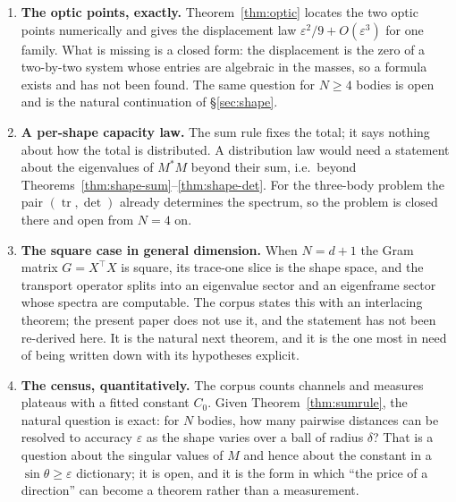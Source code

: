 \begin{enumerate}[label=\textbf{O\arabic*.},leftmargin=2.4em]
\item \textbf{The optic points, exactly.} Theorem~\ref{thm:optic} locates the two optic points
numerically and gives the displacement law $\varepsilon^2/9+O(\varepsilon^3)$ for one family.
What is missing is a closed form: the displacement is the zero of a two-by-two system whose
entries are algebraic in the masses, so a formula exists and has not been found. The same
question for $N\ge4$ bodies is open and is the natural continuation of \S\ref{sec:shape}.

\item \textbf{A per-shape capacity law.} The sum rule fixes the total; it says nothing about how
the total is distributed. A distribution law would need a statement about the eigenvalues of
$M^*M$ beyond their sum, i.e.\ beyond Theorems~\ref{thm:shape-sum}--\ref{thm:shape-det}. For the
three-body problem the pair $(\operatorname{tr},\det)$ already determines the spectrum, so the
problem is closed there and open from $N=4$ on.

\item \textbf{The square case in general dimension.} When $N=d+1$ the Gram matrix $G=X^\top X$ is
square, its trace-one slice is the shape space, and the transport operator splits into an
eigenvalue sector and an eigenframe sector whose spectra are computable. The corpus states this
with an interlacing theorem; the present paper does not use it, and the statement has not been
re-derived here. It is the natural next theorem, and it is the one most in need of being written
down with its hypotheses explicit.

\item \textbf{The census, quantitatively.} The corpus counts channels and measures plateaus with
a fitted constant $C_0$. Given Theorem~\ref{thm:sumrule}, the natural question is exact: for
$N$ bodies, how many pairwise distances can be resolved to accuracy $\varepsilon$ as the shape
varies over a ball of radius $\delta$? That is a question about the singular values of $M$ and
hence about the constant in a $\sin\theta\ge\varepsilon$ dictionary; it is open, and it is the
form in which ``the price of a direction'' can become a theorem rather than a measurement.
\end{enumerate}
